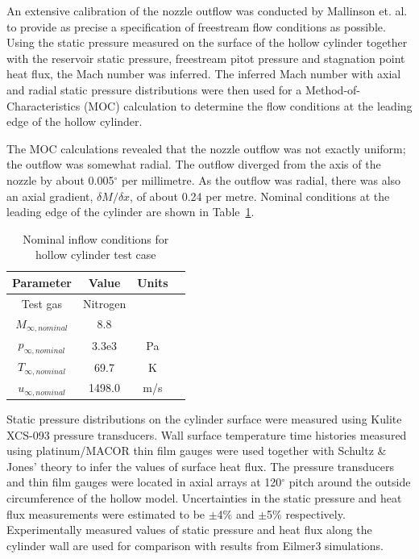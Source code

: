 An extensive calibration of the nozzle outflow was conducted by 
Mallinson et. al. to provide as precise a specification of 
freestream flow conditions as possible. Using the static pressure
measured on the surface of the hollow cylinder together with
the reservoir static pressure, freestream pitot pressure 
and stagnation point heat flux, the Mach number was inferred.
The inferred Mach number with axial and radial static pressure 
distributions were then used for a Method-of-Characteristics (MOC) 
calculation to determine the flow conditions at the leading edge
of the hollow cylinder.

The MOC calculations revealed that the nozzle outflow was not exactly 
uniform; the outflow was somewhat radial. The outflow diverged from the
axis of the nozzle by about 0.005$^{\circ}$ per millimetre. As the 
outflow was radial, there was also an axial gradient, $\delta M /\delta x$, 
of about 0.24 per metre. Nominal conditions at the leading edge of the 
cylinder are shown in Table~\ref{inflow-conditions-cylinder}. 
%
\begin{table}[h]
  \caption{Nominal inflow conditions for hollow cylinder test case}
  \label{inflow-conditions-cylinder}
  \begin{center}
    \begin{tabular}{cccl}
      \hline\hline
      Parameter & Value   & Units \\
      \hline
      Test gas    & Nitrogen &    \\
      $M_{\infty,nominal}$  & 8.8      &     \\
      $p_{\infty,nominal}$  & 3.3e3    & Pa  \\
      $T_{\infty,nominal}$  & 69.7     & K   \\
      $u_{\infty,nominal}$  & 1498.0   & m/s \\
      \hline \hline
    \end{tabular}
  \end{center}
\end{table}
%
Static pressure distributions on the cylinder surface were measured 
using Kulite XCS-093 pressure transducers. Wall surface temperature 
time histories measured using platinum/MACOR thin film gauges were 
used together with Schultz \& Jones' theory \cite{Schultz1973} to infer the 
values of surface heat flux. The pressure transducers and thin film 
gauges were located in axial arrays at 120$^{\circ}$ pitch around 
the outside circumference of the hollow model. Uncertainties in the 
static pressure and heat flux measurements were estimated to be 
$\pm$4\% and $\pm$5\% respectively. Experimentally measured values 
of static pressure and heat flux along the cylinder wall are used 
for comparison with results from Eilmer3 simulations. 


